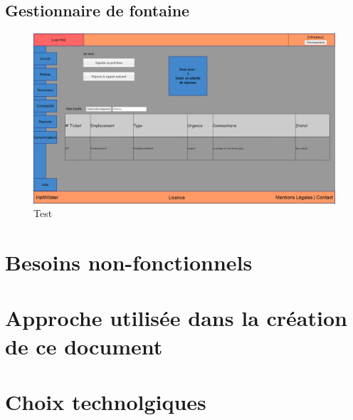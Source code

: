 \documentclass[a4paper, 11pt]{article}
\begin{document}
  \subsection{Gestionnaire de fontaine}
  \begin{figure}[H]
      \includegraphics[width=\textwidth]{Cahier_des_Charges/rapports}
      \caption{Test}
      \label{fig:reports}
  \end{figure}

\section{Besoins non-fonctionnels}
\section{Approche utilisée dans la création de ce document}
\section{Choix technolgiques}
\end{document}
